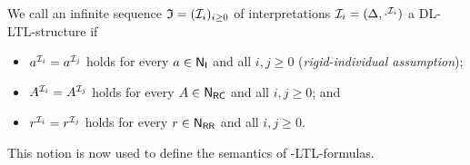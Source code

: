 \begin{definition}\label{def:dl-ltl-structure}
    We call an infinite sequence $\mathfrak{I}=(\mathcal{I}_i)_{i\ge 0}$ of interpretations
    $\mathcal{I}_i=(\Delta,\cdot^{\mathcal{I}_i})$ a DL-LTL-structure if
    \begin{itemize}
        \item $a^{\mathcal{I}_i}=a^{\mathcal{I}_j}$ holds for every $a\in\mathsf{N_I}$ and all
            $i,j\ge 0$ (\emph{rigid-individual assumption});
        \item $A^{\mathcal{I}_i}=A^{\mathcal{I}_j}$ holds for every $A\in\mathsf{N_{RC}}$ and all
            $i,j\ge 0$; and
        \item $r^{\mathcal{I}_i}=r^{\mathcal{I}_j}$ holds for every $r\in\mathsf{N_{RR}}$ and all
            $i,j\ge 0$.
    \end{itemize}
\end{definition}

\noindent
This notion is now used to define the semantics of \SHOQ-LTL-formulas.

